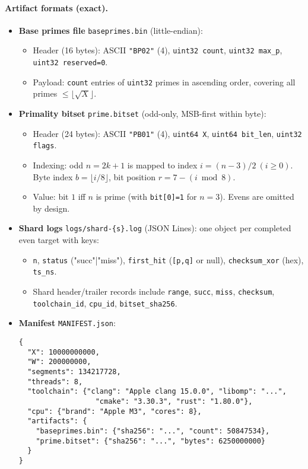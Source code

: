 \documentclass[11pt]{article}
\theoremstyle{definition}
\theoremstyle{remark}
\begin{document}
\paragraph{Artifact formats (exact).}
\begin{itemize}
  \item \textbf{Base primes file} \texttt{baseprimes.bin} (little-endian):
  \begin{itemize}
    \item Header (16 bytes): ASCII \texttt{"BP02"} (4), \texttt{uint32 count}, \texttt{uint32 max\_p}, \texttt{uint32 reserved=0}.
    \item Payload: \texttt{count} entries of \texttt{uint32} primes in ascending order, covering all primes $\le \lfloor\sqrt X\rfloor$.
  \end{itemize}
  \item \textbf{Primality bitset} \texttt{prime.bitset} (odd-only, MSB-first within byte):
  \begin{itemize}
    \item Header (24 bytes): ASCII \texttt{"PB01"} (4), \texttt{uint64 X}, \texttt{uint64 bit\_len}, \texttt{uint32 flags}.
    \item Indexing: odd $n=2k{+}1$ is mapped to index $i=(n-3)/2\ (i\ge 0)$. Byte index $b=\lfloor i/8\rfloor$, bit position $r=7-(i\bmod 8)$.
    \item Value: bit $1$ iff $n$ is prime (with \texttt{bit[0]=1} for $n=3$). Evens are omitted by design.
  \end{itemize}
  \item \textbf{Shard logs} \texttt{logs/shard-\{s\}.log} (JSON Lines): one object per completed even target with keys:
  \begin{itemize}
    \item \texttt{n}, \texttt{status} ("succ"|"miss"), \texttt{first\_hit} (\texttt{[p,q]} or null), \texttt{checksum\_xor} (hex), \texttt{ts\_ns}.
    \item Shard header/trailer records include \texttt{range}, \texttt{succ}, \texttt{miss}, \texttt{checksum}, \texttt{toolchain\_id}, \texttt{cpu\_id}, \texttt{bitset\_sha256}.
  \end{itemize}
  \item \textbf{Manifest} \texttt{MANIFEST.json}:
  \begin{verbatim}
{
  "X": 10000000000,
  "W": 200000000,
  "segments": 134217728,
  "threads": 8,
  "toolchain": {"clang": "Apple clang 15.0.0", "libomp": "...",
                  "cmake": "3.30.3", "rust": "1.80.0"},
  "cpu": {"brand": "Apple M3", "cores": 8},
  "artifacts": {
    "baseprimes.bin": {"sha256": "...", "count": 50847534},
    "prime.bitset": {"sha256": "...", "bytes": 6250000000}
  }
}
  \end{verbatim}
\end{itemize}
\end{document}
